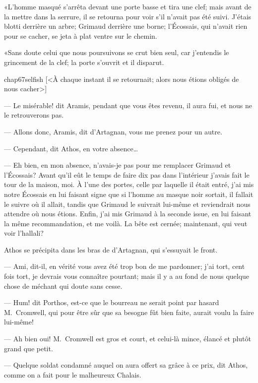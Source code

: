 «L'homme masqué s'arrêta devant une porte basse et tira une clef; mais avant de la mettre dans la serrure, il se retourna pour voir s'il n'avait pas été suivi. J'étais blotti derrière un arbre; Grimaud derrière une borne; l'Écossais, qui n'avait rien pour se cacher, se jeta à plat ventre sur le chemin.

«Sans doute celui que nous poursuivons se crut bien seul, car j'entendis le grincement de la clef; la porte s'ouvrit et il disparut.

\begin{bwbigpic}
	[\basicscale] 
	{chap67selfish}
	[<À chaque instant il se retournait; alors nous étions obligés de nous cacher>]
\end{bwbigpic}

— Le misérable! dit Aramis, pendant que vous êtes revenu, il aura fui, et nous ne le retrouverons pas.

— Allons donc, Aramis, dit d'Artagnan, vous me prenez pour un autre.

— Cependant, dit Athos, en votre absence\dots

— Eh bien, en mon absence, n'avais-je pas pour me remplacer Grimaud et l'Écossais? Avant qu'il eût le temps de faire dix pas dans l'intérieur j'avais fait le tour de la maison, moi. À l'une des portes, celle par laquelle il était entré, j'ai mis notre Écossais en lui faisant signe que si l'homme au masque noir sortait, il fallait le suivre où il allait, tandis que Grimaud le suivrait lui-même et reviendrait nous attendre où nous étions. Enfin, j'ai mis Grimaud à la seconde issue, en lui faisant la même recommandation, et me voilà. La bête est cernée; maintenant, qui veut voir l'hallali?

Athos se précipita dans les bras de d'Artagnan, qui s'essuyait le front.

— Ami, dit-il, en vérité vous avez été trop bon de me pardonner; j'ai tort, cent fois tort, je devrais vous connaître pourtant; mais il y a au fond de nous quelque chose de méchant qui doute sans cesse.

— Hum! dit Porthos, est-ce que le bourreau ne serait point par hasard M.~Cromwell, qui pour être sûr que sa besogne fût bien faite, aurait voulu la faire lui-même!

— Ah bien oui! M.~Cromwell est gros et court, et celui-là mince, élancé et plutôt grand que petit.

— Quelque soldat condamné auquel on aura offert sa grâce à ce prix, dit Athos, comme on a fait pour le malheureux Chalais.

